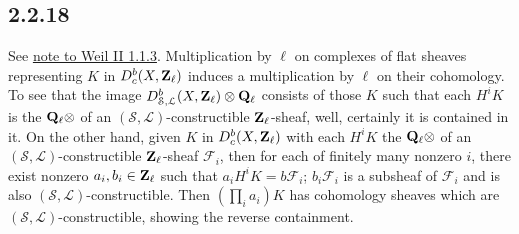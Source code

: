\documentclass[deligne.tex]{subfiles}
\begin{document}
\subsection*{2.2.18}
See \hyperref[weilII:1.1.3]{note to Weil II 1.1.3}.
Multiplication by $\ell$ on complexes of flat sheaves representing $K$
in $D_c^b(X,\mathbf{Z}_\ell)$ induces a multiplication by $\ell$ on their 
cohomology. To see that the image 
$D^b_{\mathcal S,\mathcal L}(X,\mathbf{Z}_\ell)\otimes\mathbf{Q}_\ell$
consists of those $K$ such that each $H^iK$ is the $\mathbf{Q}_\ell\otimes$
of an $(\mathcal S,\mathcal L)$-constructible $\mathbf{Z}_\ell$-sheaf, well,
certainly it is contained in it. On the other hand, given $K$ in
$D_c^b(X,\mathbf{Z}_\ell)$
with each $H^iK$ the $\mathbf{Q}_\ell\otimes$ of an
$(\mathcal S,\mathcal L)$-constructible $\mathbf{Z}_\ell$-sheaf $\mathscr F_i$,
then for each of finitely many nonzero $i$, there exist nonzero 
$a_i,b_i\in\mathbf{Z}_\ell$ such that $a_iH^iK=b\mathscr F_i$; $b_i\mathscr F_i$ is
a subsheaf of $\mathscr F_i$ and is also
$(\mathcal S,\mathcal L)$-constructible.
Then $(\prod_i a_i)K$ has cohomology sheaves which are
$(\mathcal S,\mathcal L)$-constructible, showing the reverse containment.
\end{document}

